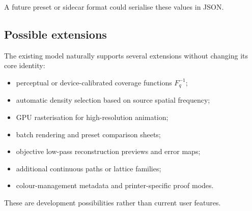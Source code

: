 A future preset or sidecar format could serialise these values in JSON.

\subsection{Possible extensions}

The existing model naturally supports several extensions without changing its core identity:

\begin{itemize}
  \item perceptual or device-calibrated coverage functions $F_q^{-1}$;
  \item automatic density selection based on source spatial frequency;
  \item GPU rasterisation for high-resolution animation;
  \item batch rendering and preset comparison sheets;
  \item objective low-pass reconstruction previews and error maps;
  \item additional continuous paths or lattice families;
  \item colour-management metadata and printer-specific proof modes.
\end{itemize}

These are development possibilities rather than current user features.


